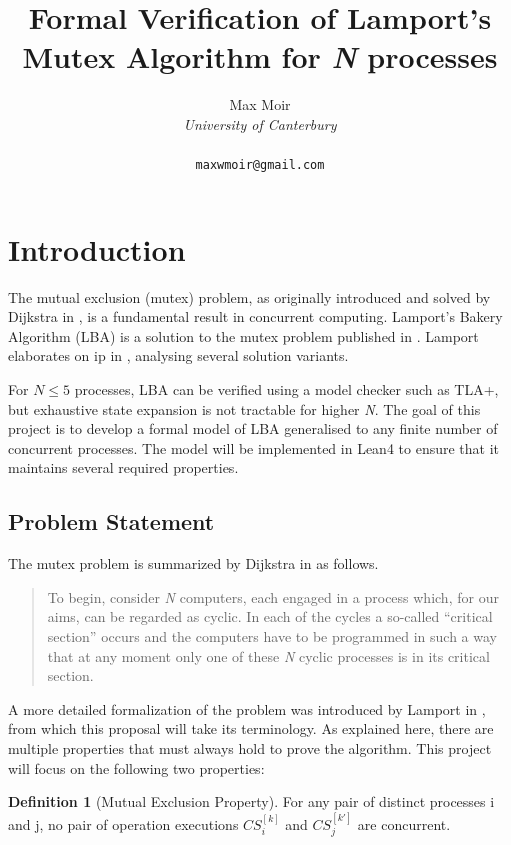 \documentclass{article}
\title{Formal Verification of Lamport's Mutex Algorithm for \emph{N} processes}
\author{
    Max Moir \\
    \textit{University of Canterbury} \\ 
    \text{Christchurch, New Zealand} \\ 
    \texttt{maxwmoir@gmail.com}
}
\theoremstyle{definition}
\newtheorem{definition}{Definition}[section]
\begin{document}
\maketitle

\section{Introduction}

The mutual exclusion (mutex) problem, as originally introduced and solved by Dijkstra in \cite{dijkstra_solution_1965}, is a fundamental result in concurrent computing.
Lamport's Bakery Algorithm (LBA) is a solution to the mutex problem published in  \cite{lamport_new_1974}. Lamport elaborates on ip in \cite{lamport_mutual_1986}, analysing several solution variants.

For $N \leq 5$ processes, LBA can be verified using a model checker such as TLA+, but exhaustive state expansion is not tractable for higher \emph{N}. 
The goal of this project is to develop a formal model of LBA generalised to any finite number of concurrent processes. 
The model will be implemented in Lean4 to ensure that it maintains several required properties.


\subsection{Problem Statement}

The mutex problem is summarized by Dijkstra in \cite{dijkstra_solution_1965} as follows.

\blockquote{
To begin, consider \emph{N} computers, each engaged in a process which, for our aims, can be regarded as cyclic.
In each of the cycles a so-called ``critical section'' occurs and the computers have to be programmed in such a way that at any moment only one of these \emph{N} cyclic processes is in its critical section.
}

\noindent 
A more detailed formalization of the problem was introduced by Lamport in \cite{lamport_mutual_1986}, from which this proposal will take its terminology.
As explained here, there are multiple properties that must always hold to prove the algorithm. 
This project will focus on the following two properties:

\begin{definition}[Mutual Exclusion Property]
    For any pair of distinct processes i and j, no pair  of operation executions $ CS_{i}^{[k]} $ and $ CS_{j}^{[k']} $ are concurrent.
\end{definition}
\end{document}
